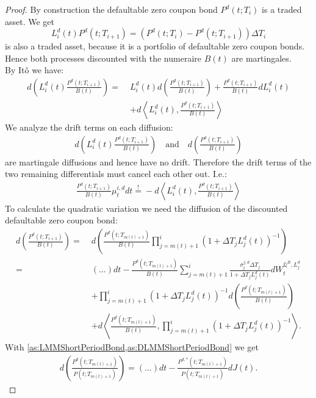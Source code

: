 \documentclass[12pt]{article}
\newcommand{\mbeq}{\overset{!}{=}}
\begin{document}
	\begin{proof}
		By construction the defaultable zero coupon bond $P^d(t; T_i)$ is a traded asset.
		We get 
		\[
			L^d_i(t)P^d(t;T_{i+1}) = (P^{d}(t;T_i) - P^{d}(t;T_{i+1}))\Delta T_i
		\]
		is also a traded asset, because it is a portfolio of defaultable zero coupon bonds. Hence both processes discounted with the numeraire $B(t)$ are martingales.\\
		By Itô we have:
		\begin{align*}
			d\left(L_i^d(t)\frac{P^d(t;T_{i+1})}{B(t)}\right) = \; &L_i^d(t) d\left(\frac{P^d(t;T_{i+1})}{B(t)}\right) +  \frac{P^d(t;T_{i+1})}{B(t)}dL_i^d(t) \\
			&+ d \left\langle  L_i^d(t), \frac{P^d(t;T_{i+1})}{B(t)} \right\rangle
		\end{align*}
		We analyze the drift terms on each diffusion:
		\begin{align*}
			d\left(L_i^d(t)\frac{P^d(t;T_{i+1})}{B(t)}\right) 
			\quad \text{and}\quad 
			d\left(\frac{P^d(t;T_{i+1})}{B(t)}\right)
		\end{align*} 
		are martingale diffusions and hence have no drift.
		Therefore the drift terms of the two remaining differentials must cancel each other out. I.e.:
		\begin{align}\label{defDriftDeriv}
			\frac{P^d(t;T_{i+1})}{B(t)} \mu^{i, d}_t dt \mbeq - d \left\langle  L_i^d(t), \frac{P^d(t;T_{i+1})}{B(t)} \right\rangle
		\end{align}
		To calculate the quadratic variation we need the diffusion of the discounted defaultable zero coupon bond:
		\begin{align*}
			d\left(\frac{P^d(t;T_{i+1})}{B(t)}\right) = \;&
			d\left(\frac{P^d(t;T_{m(t)+1})}{B(t)} \prod_{j=m(t)+1}^{i}(1+\Delta T_j L^d_j(t))^{-1}\right)\\
			 = \;& (...)dt - \frac{P^d(t;T_{m(t)+1})}{B(t)} \sum_{j=m(t)+1}^{i}\frac{ \sigma^{j, d}_t \Delta T_j}{1 + \Delta T_j L^d_j(t)} dW^{\mathbb{Q}^B, L^d_j}_t \\
			 & + \prod_{j=m(t)+1}^{i}(1+\Delta T_j L^d_j(t))^{-1} d\left(\frac{P^d(t;T_{m(t)+1})}{B(t)}\right)\\
			 & + d\left\langle\frac{P^d(t;T_{m(t)+1})}{B(t)}, \prod_{j=m(t)+1}^{i}(1+\Delta T_j L^d_j(t))^{-1}\right\rangle.
		\end{align*}
		With \cref{as:LMMShortPeriodBond,as:DLMMShortPeriodBond} we get 
		\begin{align*}
			d\left(\frac{P^d(t;T_{m(t)+1})}{P(t;T_{m(t)+1})}\right) = (...)dt - \frac{P^{d,*}(t;T_{m(t)+1})}{P(t;T_{m(t)+1})}dJ(t).

\end{align*}
\end{proof}
\end{document}
